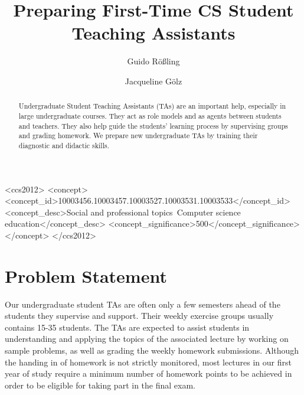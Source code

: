 \documentclass[sigconf,screen]{acmart}
\begin{document}

\title{Preparing First-Time CS Student Teaching Assistants}

\author{Guido R\"o\ss{}ling}
\author{Jacqueline G\"olz}
\begin{CCSXML}
<ccs2012>
<concept>
<concept_id>10003456.10003457.10003527.10003531.10003533</concept_id>
<concept_desc>Social and professional topics~Computer science education</concept_desc>
<concept_significance>500</concept_significance>
</concept>
</ccs2012>
\end{CCSXML}



\begin{abstract}
Undergraduate Student Teaching Assistants (TAs) are an important help, especially in large
undergraduate courses. They act as role models and as agents between students and teachers.
They also help guide the students' learning process by supervising groups and grading homework.
We prepare new undergraduate TAs by training their diagnostic and didactic skills.
\end{abstract}

\maketitle

\section{Problem Statement}

Our undergraduate student TAs are often only a few semesters ahead of the students
they supervise and support. Their weekly exercise groups usually contains 15-35 students. 
The TAs are expected to assist students in understanding and applying the topics of the associated lecture by
working on sample problems, as well as grading the weekly homework submissions. 
Although the handing in of homework is not strictly monitored, most lectures in our first year of
study require a minimum number of homework points to be achieved in order to be eligible
for taking part in the final exam.
\end{document}
